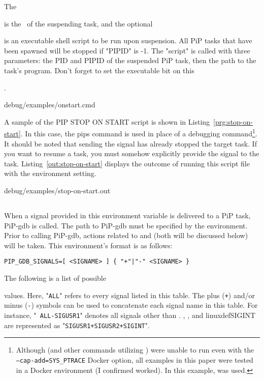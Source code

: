 The { is the \PIPID\ of the suspending
task, and the optional { is an executable
shell script to be run upon suspension. All PiP tasks that have been
spawned will be stopped if "PIPID" is -1. The "script" is called with
three parameters: the PID and PIPID of the suspended PiP task, then
the path to the task's program. Don't forget to set the executable bit
on this {.

 {debug/examples/onstart.cmd}

A sample of the PIP STOP ON START script is shown in
Listing~\ref{prg:stop-on-start}. In this case, the pips command is
used in place of a debugging command\footnote{
Although  (and other commands utilizing
) were unable to run even with the {\tt
  —cap-add=SYS_PTRACE} Docker option, all examples in this paper were
tested in a Docker environment (I confirmed 
worked). In this example,  was used.}. It should be noted
that sending the  signal has already stopped the
target task. If you want to resume a task, you must somehow explicitly
provide the  signal to the
task. Listing~\ref{out:stop-on-start} displays the outcome of running
this script file with the  environment
setting.  

 {debug/examples/stop-on-start.out}

\subsection{}

When a signal provided in this environment variable is delivered to a
PiP task, PiP-gdb is called. The path to PiP-gdb must be specified by
the  environment. Prior to calling PiP-gdb,
  actions related to  and 
  (both will be discussed below) will be taken. This environment's
  format is as follows: 

\begin{lstlisting}[frame=tb]
  PIP_GDB_SIGNALS=[ <SIGNAME> ] { "+"|"-" <SIGNAME> }
\end{lstlisting}

The following is a list of possible { values.
Here, "{\tt ALL}" refers to every signal listed in this table. The
plus ({\tt +}) and/or minus ({\tt -}) symbols can be used to
concatenate each signal name in this table. For instance, "{\tt
  ALL-SIGUSR1}" denotes all signals other than
. , , and
linuxdef{SIGINT} are represented as "{\tt SIGUSR1+SIGUSR2+SIGINT}". 

}}}}
